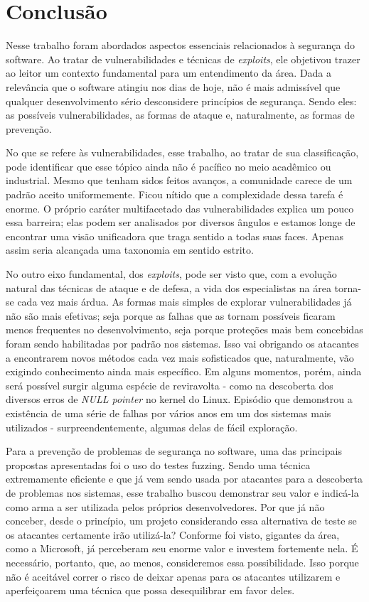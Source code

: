 
\chapter{Conclusão}
\label{chap:conclusao}
	Nesse trabalho foram abordados aspectos essenciais relacionados à segurança do software.
	Ao tratar de vulnerabilidades e técnicas de \textsl{exploits}, ele objetivou
	trazer ao leitor um contexto fundamental para um entendimento da área. Dada a relevância
	que o software atingiu nos dias de hoje, não é mais admissível que qualquer desenvolvimento
	sério desconsidere princípios de segurança. Sendo eles: as possíveis vulnerabilidades,
	as formas de ataque e, naturalmente, as formas de prevenção.


	No que se refere às vulnerabilidades, esse trabalho, ao tratar de sua classificação, pode identificar
	que esse tópico ainda não é pacífico no meio acadêmico ou industrial. Mesmo que tenham
	sidos feitos avanços, a comunidade carece de um padrão aceito uniformemente. Ficou nítido que a complexidade
	dessa tarefa é enorme. O próprio caráter multifacetado das vulnerabilidades explica um pouco essa barreira;
	elas podem ser analisados por diversos ângulos e estamos longe de encontrar uma visão unificadora
	que traga sentido a todas suas faces. Apenas assim seria alcançada uma taxonomia em sentido estrito.


	No outro eixo fundamental, dos \textsl{exploits}, pode ser visto que, com a evolução natural
	das técnicas de ataque e de defesa, a vida dos especialistas na área torna-se cada vez mais árdua.
	As formas mais simples de explorar vulnerabilidades já não são mais efetivas; seja porque as falhas
	que as tornam possíveis ficaram menos frequentes no desenvolvimento, seja porque proteções mais
	bem concebidas foram sendo habilitadas por padrão nos sistemas. Isso vai obrigando os atacantes
	a encontrarem novos métodos cada vez mais sofisticados que, naturalmente, vão exigindo conhecimento
	ainda mais específico. Em alguns momentos, porém, ainda será possível surgir alguma espécie
	de reviravolta - como na descoberta dos diversos erros de \textsl{NULL pointer} no kernel do Linux.
	Episódio que demonstrou a existência de uma série de falhas por vários anos em um dos sistemas
	mais utilizados - surpreendentemente, algumas delas de fácil exploração.


	Para a prevenção de problemas de segurança no software, uma das principais propostas apresentadas foi
	o uso do testes fuzzing. Sendo uma técnica extremamente eficiente e que já vem sendo usada
	por atacantes para a descoberta de problemas nos sistemas, esse trabalho buscou demonstrar seu valor
	e indicá-la como arma a ser utilizada pelos próprios desenvolvedores. Por que já não conceber, desde
	o princípio, um projeto considerando essa alternativa de teste se os atacantes certamente irão utilizá-la?
	Conforme foi visto, gigantes da área, como a Microsoft, já perceberam seu enorme valor e investem
	fortemente nela. É necessário, portanto, que, ao menos, consideremos essa possibilidade. Isso
	porque não é aceitável correr o risco de deixar apenas para os atacantes utilizarem e aperfeiçoarem
	uma técnica que possa desequilibrar em favor deles.

